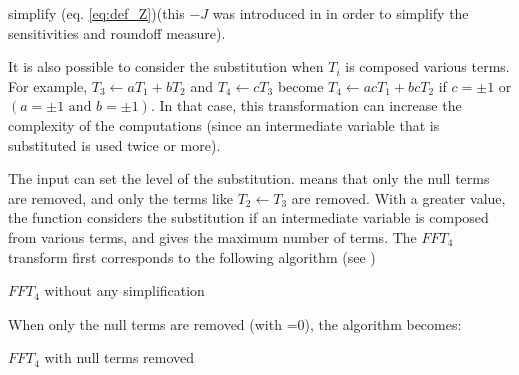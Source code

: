 \begin{command}{simplify}
(eq. \eqref{eq:def_Z})(this $-J$ was introduced in \cite{Hila07b} in order to simplify the sensitivities and
roundoff measure).
\begin{remark}
It is also possible to consider the substitution when $T_i$ is composed various terms. For example, $T_3
\leftarrow aT_1 + bT_2$ and $T_4 \leftarrow cT_3$ become $T_4 \leftarrow acT_1+bcT_2$ if $c=\pm1$ or
$(a=\pm1 \text{\ and\ }b=\pm1)$. In that case, this transformation can increase the complexity of the computations
(since an intermediate variable that is substituted is used twice or more).
\end{remark}
The input  can set the level of the substitution.  means that only the null terms are removed, and 
only the terms like $T_2 \leftarrow T_3$ are removed. With a greater value, the function considers the substitution if an
intermediate variable is composed from various terms, and  gives the maximum number of terms.
The $FFT_4$ transform first corresponds to the following algorithm (see )
\begin{algorithm}[h]
\caption{$FFT_4$ without any simplification\label{algo:FFT4_1}}
\SetLine
{}
\end{algorithm}
When only the null terms are removed (with =0), the algorithm becomes:
\begin{algorithm}[h]
\caption{$FFT_4$ with null terms removed\label{algo:FFT4_2}}
\SetLine
{}
\end{algorithm}
\end{command}
